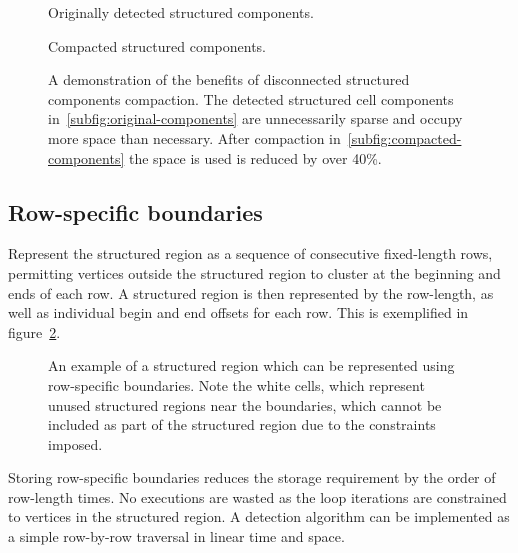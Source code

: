 \begin{figure}

\sidebyside
{
\drawmatrix[cell wd=0.8, cell ht=0.8]{\disjointAmatrix}
\caption{Originally detected structured components.}
\label{subfig:original-components}
}
{
\drawmatrix[cell wd=0.8, cell ht=0.8]{\disjointBmatrix}
\caption{Compacted structured components.}
\label{subfig:compacted-components}
}
\caption{A demonstration of the benefits of disconnected structured components compaction. The detected structured cell components in~\ref{subfig:original-components} are unnecessarily sparse and occupy more space than necessary. After compaction in~\ref{subfig:compacted-components} the space is used is reduced by over 40\%.}
\label{fig:disjoint-matrix}
\end{figure}


\subsection{Row-specific boundaries}

Represent the structured region as a sequence of consecutive fixed-length rows, permitting vertices outside the structured region to cluster at the beginning and ends of each row. A structured region is then represented by the row-length, as well as individual begin and end offsets for each row. This is exemplified in figure~\ref{fig:row-specific}.

\begin{figure}
\drawmatrix[cell wd=0.8, cell ht=0.8]{\bitmapmatrix}
\caption{An example of a structured region which can be represented using row-specific boundaries. Note the white cells, which represent unused structured regions near the boundaries, which cannot be included as part of the structured region due to the constraints imposed.}
\label{fig:row-specific}
\end{figure}

Storing row-specific boundaries reduces the storage requirement by the order of row-length times.
No executions are wasted as the loop iterations are constrained to vertices in the structured region.
A detection algorithm can be implemented as a simple row-by-row traversal in linear time and space.


